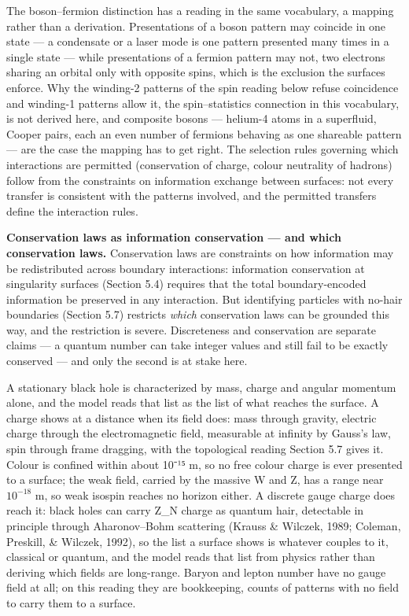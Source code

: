 \documentclass[
]{article}
\begin{document}
The boson--fermion distinction has a reading in the same vocabulary, a
mapping rather than a derivation. Presentations of a boson pattern may
coincide in one state --- a condensate or a laser mode is one pattern
presented many times in a single state --- while presentations of a
fermion pattern may not, two electrons sharing an orbital only with
opposite spins, which is the exclusion the surfaces enforce. Why the
winding-2 patterns of the spin reading below refuse coincidence and
winding-1 patterns allow it, the spin--statistics connection in this
vocabulary, is not derived here, and composite bosons --- helium-4 atoms
in a superfluid, Cooper pairs, each an even number of fermions behaving
as one shareable pattern --- are the case the mapping has to get right.
The selection rules governing which interactions are permitted
(conservation of charge, colour neutrality of hadrons) follow from the
constraints on information exchange between surfaces: not every transfer
is consistent with the patterns involved, and the permitted transfers
define the interaction rules.

\textbf{Conservation laws as information conservation --- and which
conservation laws.} Conservation laws are constraints on how information
may be redistributed across boundary interactions: information
conservation at singularity surfaces (Section 5.4) requires that the
total boundary-encoded information be preserved in any interaction. But
identifying particles with no-hair boundaries (Section 5.7) restricts
\emph{which} conservation laws can be grounded this way, and the
restriction is severe. Discreteness and conservation are separate claims
--- a quantum number can take integer values and still fail to be
exactly conserved --- and only the second is at stake here.

A stationary black hole is characterized by mass, charge and angular
momentum alone, and the model reads that list as the list of what
reaches the surface. A charge shows at a distance when its field does:
mass through gravity, electric charge through the electromagnetic field,
measurable at infinity by Gauss's law, spin through frame dragging, with
the topological reading Section 5.7 gives it. Colour is confined within
about 10⁻¹⁵ m, so no free colour charge is ever presented to a surface;
the weak field, carried by the massive W and Z, has a range near
\(10^{-18}\) m, so weak isospin reaches no horizon either. A discrete
gauge charge does reach it: black holes can carry Z\_N charge as quantum
hair, detectable in principle through Aharonov--Bohm scattering (Krauss
\& Wilczek, 1989; Coleman, Preskill, \& Wilczek, 1992), so the list a
surface shows is whatever couples to it, classical or quantum, and the
model reads that list from physics rather than deriving which fields are
long-range. Baryon and lepton number have no gauge field at all; on this
reading they are bookkeeping, counts of patterns with no field to carry
them to a surface.
\end{document}
